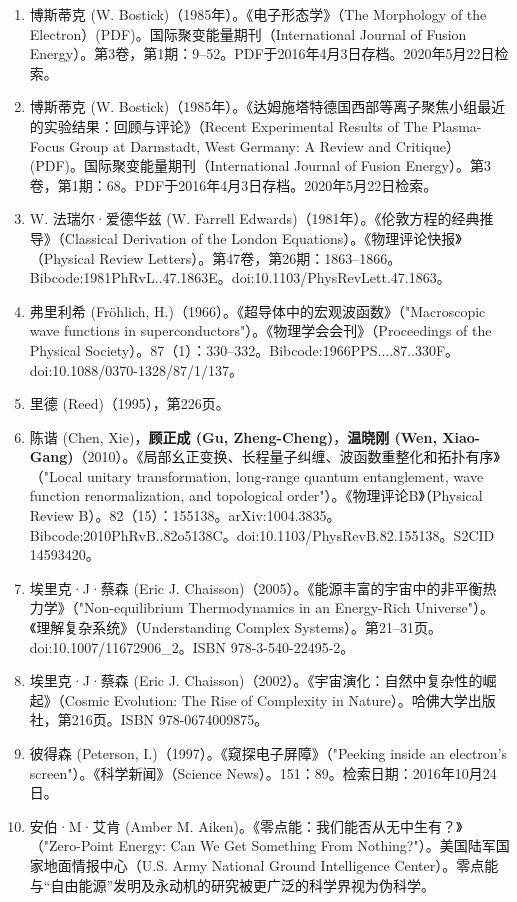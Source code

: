 \begin{enumerate}
\item 博斯蒂克 (W. Bostick)（1985年）。《电子形态学》（The Morphology of the Electron）(PDF)。国际聚变能量期刊（International Journal of Fusion Energy）。第3卷，第1期：9–52。PDF于2016年4月3日存档。2020年5月22日检索。
\item 博斯蒂克 (W. Bostick)（1985年）。《达姆施塔特德国西部等离子聚焦小组最近的实验结果：回顾与评论》（Recent Experimental Results of The Plasma-Focus Group at Darmstadt, West Germany: A Review and Critique）(PDF)。国际聚变能量期刊（International Journal of Fusion Energy）。第3卷，第1期：68。PDF于2016年4月3日存档。2020年5月22日检索。
\item W. 法瑞尔·爱德华兹 (W. Farrell Edwards)（1981年）。《伦敦方程的经典推导》（Classical Derivation of the London Equations）。《物理评论快报》（Physical Review Letters）。第47卷，第26期：1863–1866。Bibcode:1981PhRvL..47.1863E。doi:10.1103/PhysRevLett.47.1863。
\item 弗里利希 (Fröhlich, H.)（1966）。《超导体中的宏观波函数》（"Macroscopic wave functions in superconductors"）。《物理学会会刊》（Proceedings of the Physical Society）。87（1）：330–332。Bibcode:1966PPS....87..330F。doi:10.1088/0370-1328/87/1/137。
\item 里德 (Reed)（1995），第226页。
\item 陈谐 (Chen, Xie)，\textbf{顾正成 (Gu, Zheng-Cheng)}，\textbf{温晓刚 (Wen, Xiao-Gang)}（2010）。《局部幺正变换、长程量子纠缠、波函数重整化和拓扑有序》（"Local unitary transformation, long-range quantum entanglement, wave function renormalization, and topological order"）。《物理评论B》（Physical Review B）。82（15）：155138。arXiv:1004.3835。Bibcode:2010PhRvB..82o5138C。doi:10.1103/PhysRevB.82.155138。S2CID 14593420。
\item 埃里克·J·蔡森 (Eric J. Chaisson)（2005）。《能源丰富的宇宙中的非平衡热力学》（"Non-equilibrium Thermodynamics in an Energy-Rich Universe"）。《理解复杂系统》（Understanding Complex Systems）。第21–31页。doi:10.1007/11672906_2。ISBN 978-3-540-22495-2。
\item 埃里克·J·蔡森 (Eric J. Chaisson)（2002）。《宇宙演化：自然中复杂性的崛起》（Cosmic Evolution: The Rise of Complexity in Nature）。哈佛大学出版社，第216页。ISBN 978-0674009875。
\item 彼得森 (Peterson, I.)（1997）。《窥探电子屏障》（"Peeking inside an electron's screen"）。《科学新闻》（Science News）。151：89。检索日期：2016年10月24日。
\item 安伯·M·艾肯 (Amber M. Aiken)。《零点能：我们能否从无中生有？》（"Zero-Point Energy: Can We Get Something From Nothing?"）。美国陆军国家地面情报中心（U.S. Army National Ground Intelligence Center）。零点能与“自由能源”发明及永动机的研究被更广泛的科学界视为伪科学。

\end{enumerate}
